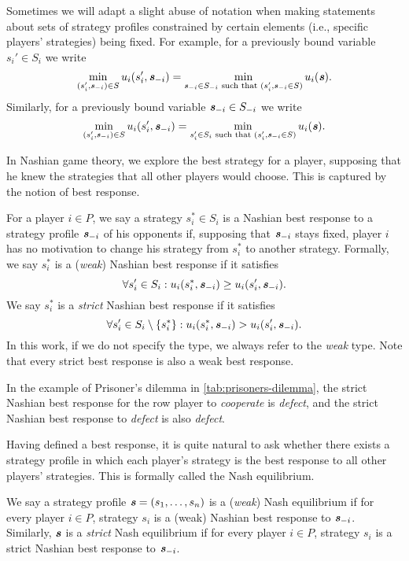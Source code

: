 Sometimes we will adapt a slight abuse of notation when making statements about sets of strategy profiles constrained by certain elements (i.e., specific players' strategies) being fixed.
For example, for a previously bound variable $s_i' \in S_i$ we write
\[
  \min_{(s_i', \boldsymbol{\mathit{s}}_{-i}) \in S}u_i(s_i', \boldsymbol{\mathit{s}}_{-i}) = \min_{\boldsymbol{\mathit{s}}_{-i} \in S_{-i} \text{ such that } (s_i', \boldsymbol{\mathit{s}}_{-i} \in S)}u_i(\boldsymbol{\mathit{s}}).
\]
Similarly, for a previously bound variable $\boldsymbol{\mathit{s}}_{-i} \in S_{-i}$ we write
\[
  \min_{(s_i', \boldsymbol{\mathit{s}}_{-i}) \in S}u_i(s_i', \boldsymbol{\mathit{s}}_{-i}) = \min_{s_i' \in S_{i} \text{ such that } (s_i', \boldsymbol{\mathit{s}}_{-i} \in S)}u_i(\boldsymbol{\mathit{s}}).
\]

In Nashian game theory, we explore the best strategy for a player, supposing that he knew the strategies that all other players would choose.
This is captured by the notion of best response.

\begin{definition}
  For a player $i \in P$, we say a strategy $s_i^* \in S_i$ is a Nashian best response to a strategy profile $\boldsymbol{\mathit{s}}_{-i}$ of his opponents if, supposing that $\boldsymbol{\mathit{s}}_{-i}$ stays fixed, player $i$ has no motivation to change his strategy from $s_i^*$ to another strategy.
  Formally, we say $s_i^*$ is a (\textit{weak}) Nashian best response if it satisfies
  \[
    \forall s_i' \in S_i: u_i(s_i^*, \boldsymbol{\mathit{s}}_{-i}) \ge u_i(s_i', \boldsymbol{\mathit{s}}_{-i}).
  \]
  We say $s_i^*$ is a \textit{strict} Nashian best response if it satisfies
  \[
    \forall s_i' \in S_i \setminus \{s_i^*\}: u_i(s_i^*, \boldsymbol{\mathit{s}}_{-i}) > u_i(s_i', \boldsymbol{\mathit{s}}_{-i}).
  \]
  In this work, if we do not specify the type, we always refer to the \textit{weak} type.
  Note that every strict best response is also a weak best response.
\end{definition}

In the example of Prisoner's dilemma in \autoref{tab:prisoners-dilemma}, the strict Nashian best response for the row player to \textit{cooperate} is \textit{defect}, and the strict Nashian best response to \textit{defect} is also \textit{defect}.

Having defined a best response, it is quite natural to ask whether there exists a strategy profile in which each player's strategy is the best response to all other players' strategies.
This is formally called the Nash equilibrium.

\begin{definition}
  We say a strategy profile $\boldsymbol{\mathit{s}} = (s_1, \dots, s_n)$ is a (\textit{weak}) Nash equilibrium if for every player $i \in P$, strategy $s_i$ is a (weak) Nashian best response to $\boldsymbol{\mathit{s}}_{-i}$.
  Similarly, $\boldsymbol{\mathit{s}}$ is a \textit{strict} Nash equilibrium if for every player $i \in P$, strategy $s_i$ is a strict Nashian best response to $\boldsymbol{\mathit{s}}_{-i}$.
\end{definition}

